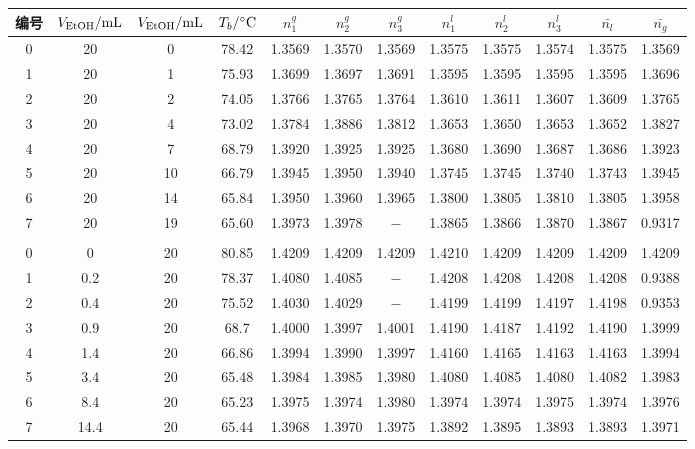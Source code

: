 \documentclass[12pt]{article}
\begin{document}
			\begin{table}[h]
				 \centering
				 \begin{tabular}{cccccccccccc}
					 \toprule
					 编号 & $V_{\rm EtOH}/{\rm mL}$ & $V_{\rm EtOH}/{\rm mL}$ & $T_{b}/{\rm ^{\circ}C}$ &$n^{g}_{1}$&$n^{g}_{2}$& $n^{g}_{3}$&$n^{l}_{1}$&$n^{l}_{2}$&$n^{l}_{3}$&$\bar{n_{l}}$&$\bar{n_{g}}$ \\
					 \midrule
					 0 & 20   & 0  & 78.42 & 1.3569 & 1.3570 & 1.3569 & 1.3575 & 1.3575 & 1.3574 & 1.3575 & 1.3569 \\
					 1 & 20   & 1  & 75.93 & 1.3699 & 1.3697 & 1.3691 & 1.3595 & 1.3595 & 1.3595 & 1.3595 & 1.3696 \\
					 2 & 20   & 2  & 74.05 & 1.3766 & 1.3765 & 1.3764 & 1.3610 & 1.3611 & 1.3607 & 1.3609 & 1.3765 \\
					 3 & 20   & 4  & 73.02 & 1.3784 & 1.3886 & 1.3812 & 1.3653 & 1.3650 & 1.3653 & 1.3652 & 1.3827 \\
					 4 & 20   & 7  & 68.79 & 1.3920 & 1.3925 & 1.3925 & 1.3680 & 1.3690 & 1.3687 & 1.3686 & 1.3923 \\
					 5 & 20   & 10 & 66.79 & 1.3945 & 1.3950 & 1.3940 & 1.3745 & 1.3745 & 1.3740 & 1.3743 & 1.3945 \\
					 6 & 20   & 14 & 65.84 & 1.3950 & 1.3960 & 1.3965 & 1.3800 & 1.3805 & 1.3810 & 1.3805 & 1.3958 \\
					 7 & 20   & 19 & 65.60 & 1.3973 & 1.3978 & $-$    & 1.3865 & 1.3866 & 1.3870 & 1.3867 & 0.9317 \\
					   &      &    &       &        &        &        &        &        &        &        &        \\
					 0 & 0    & 20 & 80.85 & 1.4209 & 1.4209 & 1.4209 & 1.4210 & 1.4209 & 1.4209 & 1.4209 & 1.4209 \\
					 1 & 0.2  & 20 & 78.37 & 1.4080 & 1.4085 & $-$    & 1.4208 & 1.4208 & 1.4208 & 1.4208 & 0.9388 \\
					 2 & 0.4  & 20 & 75.52 & 1.4030 & 1.4029 & $-$    & 1.4199 & 1.4199 & 1.4197 & 1.4198 & 0.9353 \\
					 3 & 0.9  & 20 & 68.7  & 1.4000 & 1.3997 & 1.4001 & 1.4190 & 1.4187 & 1.4192 & 1.4190 & 1.3999 \\
					 4 & 1.4  & 20 & 66.86 & 1.3994 & 1.3990 & 1.3997 & 1.4160 & 1.4165 & 1.4163 & 1.4163 & 1.3994 \\
					 5 & 3.4  & 20 & 65.48 & 1.3984 & 1.3985 & 1.3980 & 1.4080 & 1.4085 & 1.4080 & 1.4082 & 1.3983 \\
					 6 & 8.4  & 20 & 65.23 & 1.3975 & 1.3974 & 1.3980 & 1.3974 & 1.3974 & 1.3975 & 1.3974 & 1.3976 \\
					 7 & 14.4 & 20 & 65.44 & 1.3968 & 1.3970 & 1.3975 & 1.3892 & 1.3895 & 1.3893 & 1.3893 & 1.3971 \\
					\bottomrule
				 \end{tabular}
			\end{table}
\end{document}
